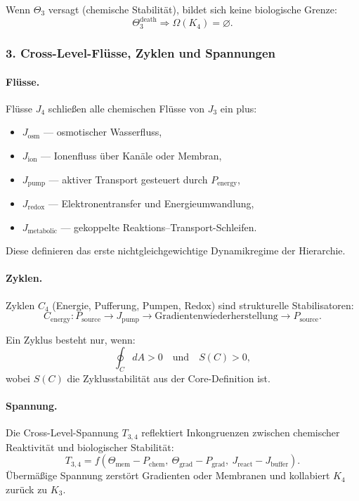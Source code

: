 Wenn $\Theta_3$ versagt (chemische Stabilität), bildet sich keine biologische
Grenze:
\[
\Theta_3^{\mathrm{death}} \Rightarrow \Omega(K_4)=\varnothing.
\]

\subsubsection{3. Cross-Level-Flüsse, Zyklen und Spannungen}

\paragraph{Flüsse.}
Flüsse $J_4$ schließen alle chemischen Flüsse von $J_3$ ein plus:
\begin{itemize}
  \item $J_{\mathrm{osm}}$ — osmotischer Wasserfluss,
  \item $J_{\mathrm{ion}}$ — Ionenfluss über Kanäle oder Membran,
  \item $J_{\mathrm{pump}}$ — aktiver Transport gesteuert durch $P_{\mathrm{energy}}$,
  \item $J_{\mathrm{redox}}$ — Elektronentransfer und Energieumwandlung,
  \item $J_{\mathrm{metabolic}}$ — gekoppelte Reaktions–Transport-Schleifen.
\end{itemize}

Diese definieren das erste nichtgleichgewichtige Dynamikregime der Hierarchie.

\paragraph{Zyklen.}
Zyklen $C_4$ (Energie, Pufferung, Pumpen, Redox) sind strukturelle Stabilisatoren:
\[
C_{\mathrm{energy}} : P_{\mathrm{source}} \rightarrow J_{\mathrm{pump}}
\rightarrow \text{Gradientenwiederherstellung} \rightarrow P_{\mathrm{source}}.
\]

Ein Zyklus besteht nur, wenn:
\[
\oint_C dA > 0 \quad\text{und}\quad S(C) > 0,
\]
wobei $S(C)$ die Zyklusstabilität aus der Core-Definition ist.

\paragraph{Spannung.}
Die Cross-Level-Spannung $T_{3,4}$ reflektiert Inkongruenzen zwischen chemischer
Reaktivität und biologischer Stabilität:
\[
T_{3,4} = f(\Theta_{\mathrm{mem}} - P_{\mathrm{chem}},\
           \Theta_{\mathrm{grad}} - P_{\mathrm{grad}},\
           J_{\mathrm{react}} - J_{\mathrm{buffer}}).
\]
Übermäßige Spannung zerstört Gradienten oder Membranen und kollabiert $K_4$
zurück zu $K_3$.

